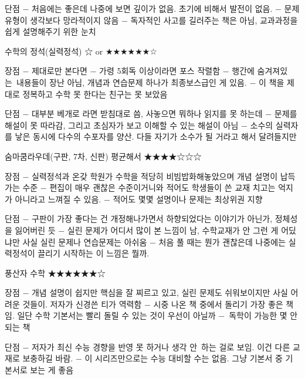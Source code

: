 단점
$-$ 처음에는 좋은데 나중에 보면 깊이가 없음. 초기에 비해서 발전이 없음.
$-$ 문제 유형이 생각보다 망라적이지 않음
$-$ 독자적인 사고를 길러주는 책은 아님, 교과과정을 쉽게 설명해주기 위한 눈치
\vspace{5mm}

수학의 정석(실력정석) ☆ or ★★★★★★☆
\vspace{5mm}

장점
$-$ 제대로만 본다면 $-$ 가령 5회독 이상이라면 포스 작렬함
$-$ 행간에 숨겨져있는 내용들이 장난 아님, 개념과 연습문제 하나가 최종보스급인 게 있음.
$-$ 이 책을 제대로 정복하고 수학 못 한다는 친구는 못 보았음
\vspace{5mm}

단점
$-$ 대부분 베개로 라면 받침대로 씀, 사놓으면 뭐하나 읽지를 못 하는데
$-$ 문제를 해설이 못 따라감, 그리고 초심자가 보고 이해할 수 있는 해설이 아님
$-$ 소수의 실력자를 낳은 동시에 다수의 수포자를 양산. 다들 자기가 소수가 될 거라고 해서 달려들지만
\vspace{5mm}

숨마쿰라우데(구판, 7차, 신판) 평균해서 ★★★★☆☆☆
\vspace{5mm}

장점
$-$ 실력정석과 온갖 학원가 수학을 적당히 비빔밥화해놓았으며 개념 설명이 납득가는 수준
$-$ 편집이 매우 괜찮은 수준이거니와 적어도 학생들이 쓴 교재 치고는 억지가 아니라고 느껴질 수 있음.
$-$ 적어도 몇몇 설명이나 문제는 최상위권 지향
\vspace{5mm}

단점
$-$ 구판이 가장 좋다는 건 개정해나가면서 하향되었다는 이야기가 아닌가, 정체성을 잃어버린 듯
$-$ 실린 문제가 어디서 많이 본 느낌이 남, 수학교재가 안 그런 게 어딨냐만 사실 실린 문제나 연습문제는 아쉬움
$-$ 처음 풀 때는 뭔가 괜찮은데 나중에는 실력정석이 끌리기 시작하는 이 느낌은 뭘까.
\vspace{5mm}

풍산자 수학 ★★★★★★☆
\vspace{5mm}

장점
$-$ 개념 설명이 쉽지만 핵심을 잘 찌르고 있고, 실린 문제도 쉬워보이지만 사실 어려운 것들이. 저자가 신경쓴 티가 역력함
$-$ 시중 나온 책 중에서 돌리기 가장 좋은 책임. 일단 수학 기본서는 빨리 돌릴 수 있는 것이 우선이 아닐까
$-$ 독학이 가능한 몇 안 되는 책
\vspace{5mm}

단점
$-$ 저자가 최신 수능 경향을 반영 못 하거나 생각 안 하는 걸로 보임. 이건 다른 교재로 보충하길 바람.
$-$ 이 시리즈만으로는 수능 대비할 수는 없음. 그냥 기본서 중 기본서로 보는 게 좋음
\vspace{5mm}


